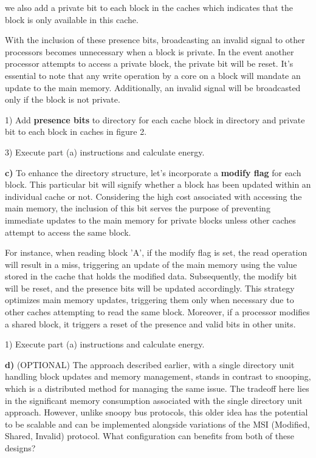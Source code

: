 \noindent we also add a private bit to each block in the caches which indicates that the block is only available in this cache.

\noindent With the inclusion of these presence bits, broadcasting an invalid signal to other processors becomes unnecessary when a block is private. In the event another processor attempts to access a private block, the private bit will be reset. It's essential to note that any write operation by a core on a block will mandate an update to the main memory. Additionally, an invalid signal will be broadcasted only if the block is not private. 

\vspace{1mm}

1) Add \textbf{presence bits} to directory for each cache block in directory and private bit to each block in caches in figure 2.


3) Execute part (a) instructions and calculate energy. 

\vspace{2cm}

\textbf{c)} To enhance the directory structure, let's incorporate a \textbf{modify flag} for each block. This particular bit will signify whether a block has been updated within an individual cache or not. Considering the high cost associated with accessing the main memory, the inclusion of this bit serves the purpose of preventing immediate updates to the main memory for private blocks unless other caches attempt to access the same block.

\noindent For instance, when reading block 'A', if the modify flag is set, the read operation will result in a miss, triggering an update of the main memory using the value stored in the cache that holds the modified data. Subsequently, the modify bit will be reset, and the presence bits will be updated accordingly. This strategy optimizes main memory updates, triggering them only when necessary due to other caches attempting to read the same block. Moreover, if a processor modifies a shared block, it triggers a reset of the presence and valid bits in other units.

1) Execute part (a) instructions and calculate energy. 


\vspace{3mm}

\textbf{d)} (OPTIONAL) The approach described earlier, with a single directory unit handling block updates and memory management, stands in contrast to snooping, which is a distributed method for managing the same issue. The tradeoff here lies in the significant memory consumption associated with the single directory unit approach. However, unlike snoopy bus protocols, this older idea has the potential to be scalable and can be implemented alongside variations of the MSI (Modified, Shared, Invalid) protocol. What configuration can benefits from both of these designs?